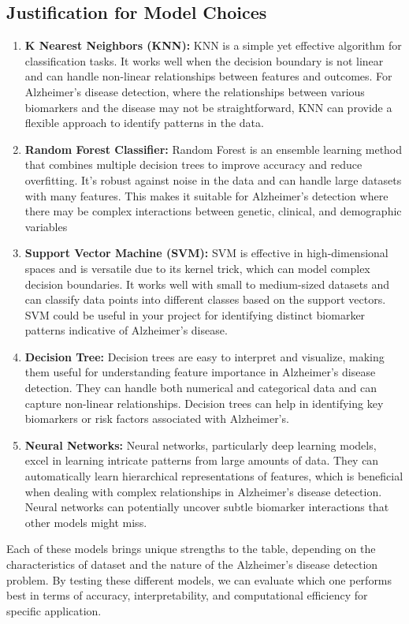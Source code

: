 \documentclass[a4paper,12pt]{report}
\begin{document}
\subsection{Justification for Model Choices}
\begin{enumerate}
\item\textbf{K Nearest Neighbors (KNN):}
KNN is a simple yet effective algorithm for classification tasks. It works well when the decision boundary is not linear and can handle non-linear relationships between features and outcomes. For Alzheimer's disease detection, where the relationships between various biomarkers and the disease may not be straightforward, KNN can provide a flexible approach to identify patterns in the data.

\item\textbf{Random Forest Classifier:}
Random Forest is an ensemble learning method that combines multiple decision trees to improve accuracy and reduce overfitting. It's robust against noise in the data and can handle large datasets with many features. This makes it suitable for Alzheimer's detection where there may be complex interactions between genetic, clinical, and demographic variables

\item\textbf{Support Vector Machine (SVM):}
SVM is effective in high-dimensional spaces and is versatile due to its kernel trick, which can model complex decision boundaries. It works well with small to medium-sized datasets and can classify data points into different classes based on the support vectors. SVM could be useful in your project for identifying distinct biomarker patterns indicative of Alzheimer's disease.

\item\textbf{Decision Tree:}
Decision trees are easy to interpret and visualize, making them useful for understanding feature importance in Alzheimer's disease detection. They can handle both numerical and categorical data and can capture non-linear relationships. Decision trees can help in identifying key biomarkers or risk factors associated with Alzheimer's.

\item\textbf{Neural Networks:}
Neural networks, particularly deep learning models, excel in learning intricate patterns from large amounts of data. They can automatically learn hierarchical representations of features, which is beneficial when dealing with complex relationships in Alzheimer's disease detection. Neural networks can potentially uncover subtle biomarker interactions that other models might miss.
\end{enumerate}
{}
 Each of these models brings unique strengths to the table, depending on the characteristics of dataset and the nature of the Alzheimer's disease detection problem. By testing these different models, we can evaluate which one performs best in terms of accuracy, interpretability, and computational efficiency for specific application.
\end{document}
